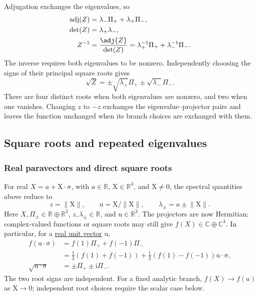 \documentclass[11pt]{article}
\newcommand{\pv}[1]{{#1}}
\newcommand{\pvGreek}[1]{{#1}}
\newcommand{\vstyle}[1]{{\bm{\mathrm{#1}}}}
\newcommand{\pX}{\pv{X}}
\newcommand{\pZ}{\pv{Z}}
\newcommand{\pvPi}{\pvGreek{\Pi}}
\numberwithin{equation}{section}
\newcommand{\R}{\mathbb{R}}
\newcommand{\C}{\mathbb{C}}
\newcommand{\ii}{\mathrm{i}}
\newcommand{\dotprod}{\cdot}
\newcommand{\bsig}{\vstyle{\sigma}}
\newcommand{\bX}{\vstyle{X}}
\newcommand{\bu}{\vstyle{u}}
\begin{document}
Adjugation exchanges the eigenvalues, so
\begin{align*}
 \operatorname{adj}(\pZ)&=\lambda_-\pvPi_++\lambda_+\pvPi_-,\\
 \det(\pZ)&=\lambda_+\lambda_-,\\
 \pZ^{-1}&=\frac{\adj {\pZ}}{\det(\pZ)}
       =\lambda_+^{-1}\pvPi_++\lambda_-^{-1}\pvPi_-.
\end{align*}
The inverse requires both eigenvalues to be nonzero.  Independently choosing
the signs of their principal square roots gives
\begin{equation*}
 \sqrt {\pZ}=\pm\sqrt{\lambda_+}\pvPi_+\pm\sqrt{\lambda_-}\pvPi_-.
\end{equation*}
There are four distinct roots when both eigenvalues are nonzero, and two
when one vanishes.  Changing $z$ to $-z$ exchanges the eigenvalue--projector
pairs and leaves the function unchanged when its branch choices are
exchanged with them.

\subsection{Square roots and repeated eigenvalues}

\subsubsection{Real paravectors and direct square roots}
For real $\pX=a+\bX\dotprod\bsig$, with $a\in\R$, $\bX\in\R^3$, and
$\bX\ne0$, the spectral quantities above reduce to
\[
 z=\lVert\bX\rVert,\qquad
 \bu=\bX/\lVert\bX\rVert,\qquad
 \lambda_\pm=a\pm\lVert\bX\rVert.
\]
Here $\pX,\pvPi_\pm\in\R\oplus\R^3$, $z,\lambda_\pm\in\R$,
and $\bu\in\R^3$. The projectors are now Hermitian; complex-valued
functions or square roots may still give $f(\pX)\in\C\oplus\C^3$.  In particular, for a
\hyperref[def:real-unit-vector]{real unit vector} $\bu$,
\begin{align*}
 f(\bu\dotprod\bsig)
 &=f(1)\pvPi_++f(-1)\pvPi_-\\
 &=\tfrac12(f(1)+f(-1))
  +\tfrac12(f(1)-f(-1))\bu\dotprod\bsig,\\
 \sqrt{\bu\dotprod\bsig}&=\pm\pvPi_+\pm\ii\pvPi_-.
\end{align*}
The two root signs are independent.  For a fixed analytic branch,
$f(\pX)\to f(a)$ as $\bX\to0$; independent root choices require the
scalar case below.
\end{document}
